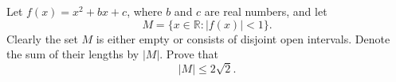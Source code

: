 \documentclass{article}
\begin{document}
\setlength{\parindent}{0pt}
Let $f(x)=x^{2}+bx+c$, where $b$ and $c$ are real numbers, and let$$M=\{x\in\mathbb{R}:|f(x)|<1\}.$$Clearly the set $M$ is either empty or consists of disjoint open intervals. Denote the sum of their lengths by $|M|$. Prove that$$|M|\le2\sqrt{2}.$$
\end{document}
